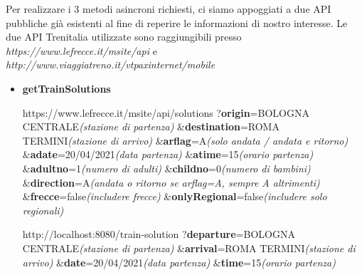 Per realizzare i 3 metodi asincroni richiesti, ci siamo appoggiati a due API pubbliche già esistenti al fine di reperire le informazioni di nostro interesse. \newline
Le due API Trenitalia utilizzate sono raggiungibili presso \emph{https://www.lefrecce.it/msite/api} e \emph{http://www.viaggiatreno.it/vt{\textunderscore}pax{\textunderscore}internet/mobile}

\begin{itemize}
    \item \textbf{getTrainSolutions}\newline
    \begin{info}\newline

    https://www.lefrecce.it/msite/api/solutions\newline
    ?\textbf{origin}=BOLOGNA CENTRALE\hfill\emph{(stazione di partenza)}\newline
    \&\textbf{destination}=ROMA TERMINI\hfill\emph{(stazione di arrivo)}\newline
    \&\textbf{arflag}=A\hfill\emph{(solo andata / andata e ritorno)}\newline
    \&\textbf{adate}=20/04/2021\hfill\emph{(data partenza)}\newline
    \&\textbf{atime}=15\hfill\emph{(orario partenza)}\newline
    \&\textbf{adultno}=1\hfill\emph{(numero di adulti)}\newline
    \&\textbf{childno}=0\hfill\emph{(numero di bambini)}\newline
    \&\textbf{direction}=A\hfill\emph{(andata o ritorno se arflag=A, sempre A altrimenti)}\newline
    \&\textbf{frecce}=false\hfill\emph{(includere frecce)}\newline
    \&\textbf{onlyRegional}=false\hfill\emph{(includere solo regionali)}
    \end{info}

    \begin{info}\newline

    http://localhost:8080/train-solution\newline
    ?\textbf{departure}=BOLOGNA CENTRALE\hfill\emph{(stazione di partenza)}\newline
    \&\textbf{arrival}=ROMA TERMINI\hfill\emph{(stazione di arrivo)}\newline
    \&\textbf{date}=20/04/2021\hfill\emph{(data partenza)}\newline
    \&\textbf{time}=15\hfill\emph{(orario partenza)}
    \end{info}


\end{itemize}
